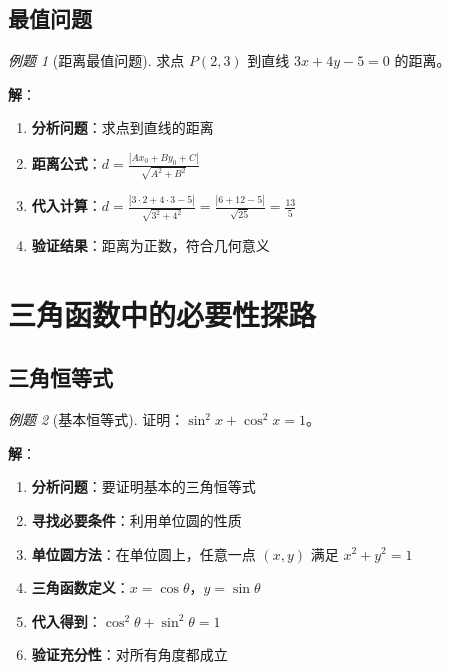 \documentclass[a4paper,11pt]{ctexart}
\newcommand{\keypoint}[1]{\textcolor{secondary}{\textbf{#1}}}
\theoremstyle{definition}
\theoremstyle{remark}
\newtheorem{example}{例题}[section]
\begin{document}
\subsection{最值问题}

\begin{example}[距离最值问题]
求点 $P(2, 3)$ 到直线 $3x + 4y - 5 = 0$ 的距离。

\textbf{解}：
\begin{enumerate}
    \item \keypoint{分析问题}：求点到直线的距离
    \item \keypoint{距离公式}：$d = \frac{|Ax_0 + By_0 + C|}{\sqrt{A^2 + B^2}}$
    \item \keypoint{代入计算}：$d = \frac{|3 \cdot 2 + 4 \cdot 3 - 5|}{\sqrt{3^2 + 4^2}} = \frac{|6 + 12 - 5|}{\sqrt{25}} = \frac{13}{5}$
    \item \keypoint{验证结果}：距离为正数，符合几何意义
\end{enumerate}
\end{example}

\newpage

\section{三角函数中的必要性探路}

\subsection{三角恒等式}

\begin{example}[基本恒等式]
证明：$\sin^2 x + \cos^2 x = 1$。

\textbf{解}：
\begin{enumerate}
    \item \keypoint{分析问题}：要证明基本的三角恒等式
    \item \keypoint{寻找必要条件}：利用单位圆的性质
    \item \keypoint{单位圆方法}：在单位圆上，任意一点 $(x, y)$ 满足 $x^2 + y^2 = 1$
    \item \keypoint{三角函数定义}：$x = \cos \theta$，$y = \sin \theta$
    \item \keypoint{代入得到}：$\cos^2 \theta + \sin^2 \theta = 1$
    \item \keypoint{验证充分性}：对所有角度都成立
\end{enumerate}
\end{example}
\end{document}
